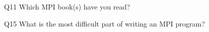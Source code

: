 \begin{description}%
\item{Q11} Which MPI book(s) have you read?%
\item{Q15} What is the most difficult part of writing an MPI program?%
\end{description}%
